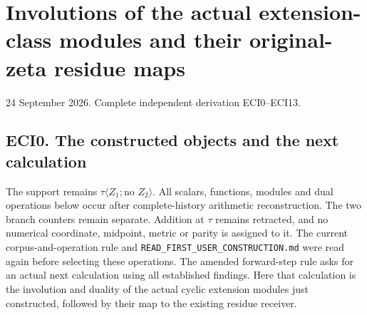 \section{Involutions of the actual extension-class modules and their
original-zeta residue
maps}\label{involutions-of-the-actual-extension-class-modules-and-their-original-zeta-residue-maps}

24 September 2026. Complete independent derivation ECI0--ECI13.

\subsection{ECI0. The constructed objects and the next
calculation}\label{eci0.-the-constructed-objects-and-the-next-calculation}

The support remains \(\tau\langle Z_1;\text{no }Z_2\rangle\). All
scalars, functions, modules and dual operations below occur after
complete-history arithmetic reconstruction. The two branch counters
remain separate. Addition at \(\tau\) remains retracted, and no
numerical coordinate, midpoint, metric or parity is assigned to it. The
current corpus-and-operation rule and
\nolinkurl{READ_FIRST_USER_CONSTRUCTION.md} were read again before
selecting these operations. The amended forward-step rule asks for an
actual next calculation using all established findings. Here that
calculation is the involution and duality of the actual cyclic extension
modules just constructed, followed by their map to the existing residue
receiver.

